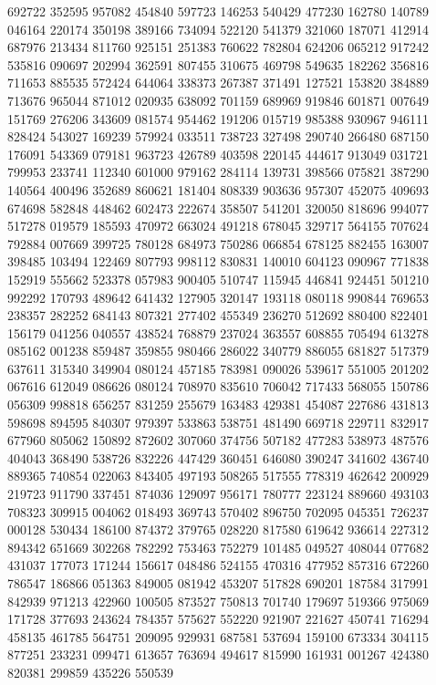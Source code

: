 {692722 352595 957082 454840 597723 146253 540429 477230 162780 140789 046164%
220174 350198 389166 734094 522120 541379 321060 187071 412914 687976 213434%
811760 925151 251383 760622 782804 624206 065212 917242 535816 090697 202994%
362591 807455 310675 469798 549635 182262 356816 711653 885535 572424 644064%
338373 267387 371491 127521 153820 384889 713676 965044 871012 020935 638092%
701159 689969 919846 601871 007649 151769 276206 343609 081574 954462 191206%
015719 985388 930967 946111 828424 543027 169239 579924 033511 738723 327498%
290740 266480 687150 176091 543369 079181 963723 426789 403598 220145 444617%
913049 031721 799953 233741 112340 601000 979162 284114 139731 398566 075821%
387290 140564 400496 352689 860621 181404 808339 903636 957307 452075 409693%
674698 582848 448462 602473 222674 358507 541201 320050 818696 994077 517278%
019579 185593 470972 663024 491218 678045 329717 564155 707624 792884 007669%
399725 780128 684973 750286 066854 678125 882455 163007 398485 103494 122469%
807793 998112 830831 140010 604123 090967 771838 152919 555662 523378 057983%
900405 510747 115945 446841 924451 501210 992292 170793 489642 641432 127905%
320147 193118 080118 990844 769653 238357 282252 684143 807321 277402 455349%
236270 512692 880400 822401 156179 041256 040557 438524 768879 237024 363557%
608855 705494 613278 085162 001238 859487 359855 980466 286022 340779 886055%
681827 517379 637611 315340 349904 080124 457185 783981 090026 539617 551005%
201202 067616 612049 086626 080124 708970 835610 706042 717433 568055 150786%
056309 998818 656257 831259 255679 163483 429381 454087 227686 431813 598698%
894595 840307 979397 533863 538751 481490 669718 229711 832917 677960 805062%
150892 872602 307060 374756 507182 477283 538973 487576 404043 368490 538726%
832226 447429 360451 646080 390247 341602 436740 889365 740854 022063 843405%
497193 508265 517555 778319 462642 200929 219723 911790 337451 874036 129097%
956171 780777 223124 889660 493103 708323 309915 004062 018493 369743 570402%
896750 702095 045351 726237 000128 530434 186100 874372 379765 028220 817580%
619642 936614 227312 894342 651669 302268 782292 753463 752279 101485 049527%
408044 077682 431037 177073 171244 156617 048486 524155 470316 477952 857316%
672260 786547 186866 051363 849005 081942 453207 517828 690201 187584 317991%
842939 971213 422960 100505 873527 750813 701740 179697 519366 975069 171728%
377693 243624 784357 575627 552220 921907 221627 450741 716294 458135 461785%
564751 209095 929931 687581 537694 159100 673334 304115 877251 233231 099471%
613657 763694 494617 815990 161931 001267 424380 820381 299859 435226 550539%
}
